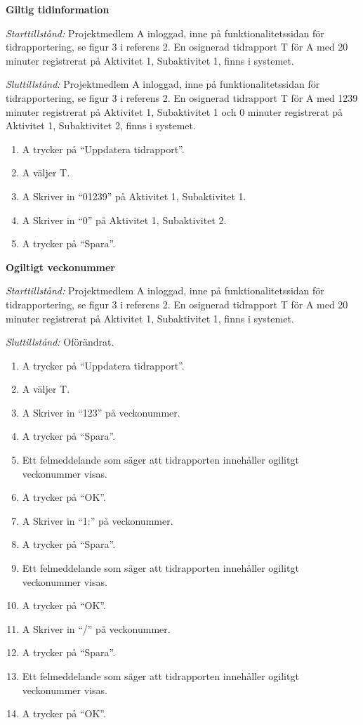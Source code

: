 \documentclass[a4paper]{article}
\begin{document}
\begin{FT}
\item\textbf{Giltig tidinformation}

\emph{Starttillstånd:} Projektmedlem A inloggad, inne på funktionalitetssidan för tidrapportering, se figur 3 i referens 2. En osignerad tidrapport T för A med 20 minuter registrerat på Aktivitet 1, Subaktivitet 1, finns i systemet.

\emph{Sluttillstånd:} Projektmedlem A inloggad, inne på funktionalitetssidan för tidrapportering, se figur 3 i referens 2. En osignerad tidrapport T för A med 1239 minuter registrerat på Aktivitet 1, Subaktivitet 1 och 0 minuter registrerat på Aktivitet 1, Subaktivitet 2, finns i systemet.

\begin{enumerate}
 \item A trycker på ``Uppdatera tidrapport''.
 \item A väljer T.
 \item A Skriver in ``01239'' på Aktivitet 1, Subaktivitet 1.
 \item A Skriver in ``0'' på Aktivitet 1, Subaktivitet 2.
 \item A trycker på ``Spara''.
\end{enumerate}

\item\textbf{Ogiltigt veckonummer}

\emph{Starttillstånd:} Projektmedlem A inloggad, inne på funktionalitetssidan för tidrapportering, se figur 3 i referens 2. En osignerad tidrapport T för A med 20 minuter registrerat på Aktivitet 1, Subaktivitet 1, finns i systemet.

\emph{Sluttillstånd:} Oförändrat.

\begin{enumerate}
\item A trycker på ``Uppdatera tidrapport''.
\item A väljer T.
\item A Skriver in ``123'' på veckonummer.
\item A trycker på ``Spara''.
\item Ett felmeddelande som säger att tidrapporten innehåller ogilitgt veckonummer visas.
\item A trycker på ``OK''.
\item A Skriver in ``1:'' på veckonummer.
\item A trycker på ``Spara''.
\item Ett felmeddelande som säger att tidrapporten innehåller ogilitgt veckonummer visas.
\item A trycker på ``OK''.
\item A Skriver in ``/'' på veckonummer.
\item A trycker på ``Spara''.
\item Ett felmeddelande som säger att tidrapporten innehåller ogilitgt veckonummer visas.
\item A trycker på ``OK''.
\end{enumerate}


\end{FT}
\end{document}

